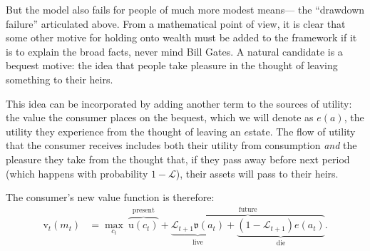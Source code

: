 \documentclass[12pt,letterpaper, fleqn]{article}
\newcommand{\uFunc}{\mathrm{u}}
\newcommand{\vFunc}{\mathrm{v}}
\newcommand{\Alive}{\mathcal{L}}
\newcommand{\cNrm}{c}
\newcommand{\mNrm}{m}
\newcommand{\aNrm}{a}
\newcommand{\bqstNrm}{e}
\begin{document}
But the model also fails for people of much more modest means--- the ``drawdown failure'' articulated above.
From a mathematical point of view, it is clear that some other motive for holding onto wealth must be added to the framework if it is to explain the broad facts, never mind Bill Gates.
A natural candidate is a bequest motive: the idea that people take pleasure in the thought of leaving something to their heirs.

This idea can be incorporated by adding another term to the sources of utility: the value the consumer places on the bequest, which we will denote as $\bqstNrm(\aNrm)$, the utility they experience from the thought of leaving an $\bqstNrm$state.
The flow of utility that the consumer receives includes both their utility from consumption \textit{and} the pleasure they take from the thought that, if they pass away before next period (which happens with probability $1 -\Alive$), their assets will pass to their heirs.

The consumer's new value function is therefore:
\begin{align}
    {\vFunc}_{t}({\mNrm}_{t}) & = \max_{\cNrm_{t}} ~ \overbrace{\uFunc(\cNrm_{t})}^{\text{present}}+\overbrace{\underbrace{\Alive_{t+1}\mathfrak{v}(\aNrm_{t})}_{\text{live}} + \underbrace{(1-\Alive_{t+1})\bqstNrm({\aNrm}_{t})}_{\text{die}}
    }^{\text{future}}.
\end{align}
\end{document}
